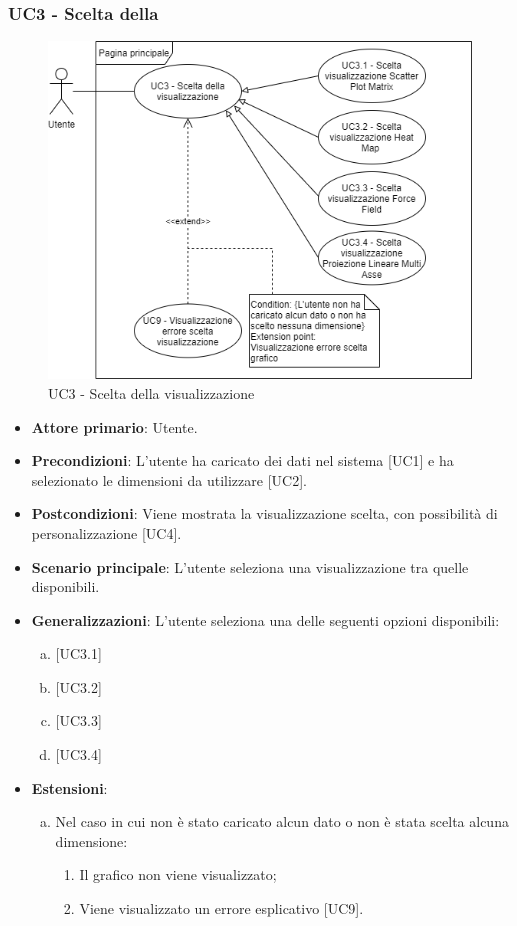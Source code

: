 \newpage
\subsubsection{UC3 - Scelta della }
\begin{figure}[h]
\includegraphics[width=\linewidth]{section/Images/UC3.png}
\centering
\caption{UC3 - Scelta della visualizzazione}
\end{figure}
\begin{itemize}
	\item \textbf{Attore primario}: Utente.
	\item \textbf{Precondizioni}: L'utente ha caricato dei dati nel sistema [UC1] e ha selezionato le dimensioni da utilizzare [UC2].
	\item \textbf{Postcondizioni}: Viene mostrata la visualizzazione scelta, con possibilità di personalizzazione [UC4].
	\item \textbf{Scenario principale}: L'utente seleziona una visualizzazione tra quelle disponibili.
	\item \textbf{Generalizzazioni}: L'utente seleziona una delle seguenti opzioni disponibili:
		\begin{enumerate}[(a)]
			\item {}
			\item {}
			\item {}
			\item {}
		\end{enumerate}
	\item \textbf{Estensioni}:
	\begin{enumerate}[(a)]
		\item Nel caso in cui non è stato caricato alcun dato o non è stata scelta alcuna dimensione:
		\begin{enumerate}[1.]
			\item Il grafico non viene visualizzato;
			\item Viene visualizzato un errore esplicativo [UC9].
		\end{enumerate}
	\end{enumerate}
\end{itemize}
